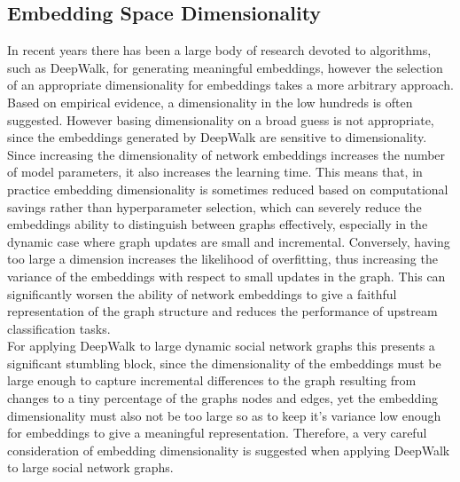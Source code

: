 \documentclass[a4paper]{article}
\begin{document}
\subsection{Embedding Space Dimensionality}
In recent years there has been a large body of research devoted to algorithms, such as DeepWalk, for generating meaningful embeddings, however the selection of an appropriate dimensionality for embeddings
takes a more arbitrary approach. Based on empirical evidence, a dimensionality in the low hundreds is often suggested\cite{bradford2008}. However basing dimensionality on a broad guess is not appropriate, since the embeddings generated by DeepWalk are sensitive to dimensionality.\\
Since increasing the dimensionality of network embeddings increases the number of model parameters, it also increases the learning time. This means that,
in practice embedding dimensionality is sometimes reduced based on computational savings rather than hyperparameter selection, which can severely reduce the embeddings ability to
distinguish between graphs effectively, especially in the dynamic case where graph updates are small and incremental.
Conversely, having too large a dimension increases the likelihood of overfitting, thus increasing the variance of the embeddings with respect to small updates in the graph. This can significantly
worsen the ability of network embeddings to give a faithful representation of the graph structure and reduces the performance of upstream classification
tasks.\\
For applying DeepWalk to large dynamic social network graphs this presents a significant stumbling block, since the dimensionality of the embeddings must be large enough to capture incremental differences
to the graph resulting from changes to a tiny percentage of the graphs nodes and edges, yet the embedding dimensionality must also not be too large so as to keep it's variance low enough for embeddings to
give a meaningful representation. Therefore, a very careful consideration of embedding dimensionality is suggested when applying DeepWalk to large social network graphs.
\end{document}
